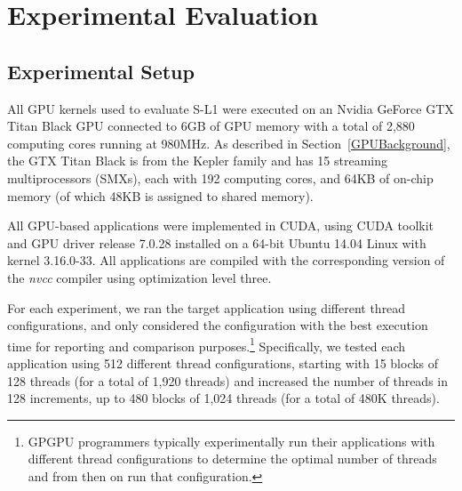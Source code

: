 \section{Experimental Evaluation}\label{sec:results}

\subsection{Experimental Setup}
\label{sec:expSetup}

All GPU kernels used to evaluate S-L1 were executed on an Nvidia GeForce GTX Titan Black GPU connected to 6GB of GPU memory with a total of 2,880 computing cores running at 980MHz.
As described in Section~\ref{GPUBackground}, the GTX Titan Black is from the Kepler family and has 15 streaming
multiprocessors (SMXs), each with 192 computing cores,  and 64KB of on-chip memory (of which 48KB is assigned to shared memory).

All GPU-based applications were implemented in CUDA, using CUDA toolkit and GPU driver release 7.0.28 installed on a 64-bit Ubuntu 14.04 Linux with kernel 3.16.0-33.
All applications are compiled with the corresponding version of the {\it nvcc} compiler using optimization level three.

For each experiment, we ran the target application using different thread configurations,
and only considered the configuration with the best execution time for reporting and comparison purposes.\footnote{ 
    GPGPU programmers typically experimentally run their applications  with different thread configurations to
    determine the optimal number of threads and from then on run that configuration.}
Specifically, we tested each application using 512 different thread configurations,
starting with 15 blocks of 128 threads (for a total of 1,920 threads) and increased the number of threads in 128 increments, up to 480 blocks of 1,024 threads (for a total of 480K threads).

